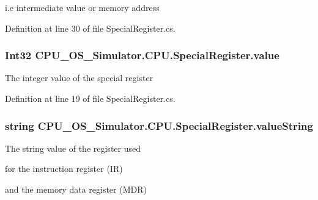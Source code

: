 i.\+e intermediate value or memory address 



Definition at line 30 of file Special\+Register.\+cs.

\hypertarget{class_c_p_u___o_s___simulator_1_1_c_p_u_1_1_special_register_a90d144e675bb3fe7bbc1f75bafdfde36}{}
\subsubsection[{value}]{\setlength{\rightskip}{0pt plus 5cm}Int32 C\+P\+U\+\_\+\+O\+S\+\_\+\+Simulator.\+C\+P\+U.\+Special\+Register.\+value\hspace{0.3cm}{\ttfamily [private]}}\label{class_c_p_u___o_s___simulator_1_1_c_p_u_1_1_special_register_a90d144e675bb3fe7bbc1f75bafdfde36}


The integer value of the special register 



Definition at line 19 of file Special\+Register.\+cs.

\hypertarget{class_c_p_u___o_s___simulator_1_1_c_p_u_1_1_special_register_a540a55b17a53591312e76689d051abac}{}
\subsubsection[{value\+String}]{\setlength{\rightskip}{0pt plus 5cm}string C\+P\+U\+\_\+\+O\+S\+\_\+\+Simulator.\+C\+P\+U.\+Special\+Register.\+value\+String\hspace{0.3cm}{\ttfamily [private]}}\label{class_c_p_u___o_s___simulator_1_1_c_p_u_1_1_special_register_a540a55b17a53591312e76689d051abac}


The string value of the register used 

for the instruction register (I\+R) 

and the memory data register (M\+D\+R) 



